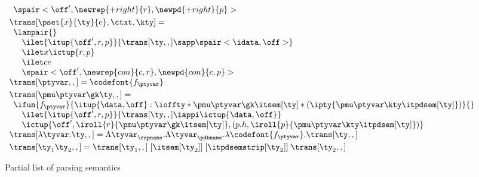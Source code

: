 \begin{figure}
\[\begin{array}{l}
\begin{array}{l}
{    \def \r {\newrep {+right}{r}}
    \def \p {\newpd {+right}{p}}
    \spair<\off',\r,\p>
  }\\ %
  \end{array}
\\[3pt]
  \trans[\pset{x}{\ty}{e},\ctxt,\kty] = \\
  \begin{array}{l}  
    \lampair{} \\
    \quad \ilet {\itup{\off',r,p}}{\trans[\ty,,] \sapp \spair<\idata,\off>} \\
    \quad \ilet x {\ictup{r,p}}\\
    \quad \ilet c e \\
    \quad \spair<\off',\newrep {con} {c,r},\newpd {con} {c,p}>
  \end{array}
\\[3pt]
\trans[\ptyvar,,] = \codefont{f_\ptyvar}
\\[3pt]
\trans[\pmu \ptyvar \gk \ty,,] = \\
  \begin{array}{l}
  \ifun {f_\ptyvar} {\itup{\data,\off} :
    \ioffty * \pmu \ptyvar \gk \itsem[\ty] 
                    * (\ipty{\pmu \ptyvar \kty \itpdsem[\ty]}) } {}\\
  \quad \ilet {\itup{\off',r,p}} 
   {\trans[\ty,,] \iappi \ictup{\data,\off}} \\ 
  \quad \ictup{\off',\iroll{r}{\pmu \ptyvar \gk \itsem[\ty]},
     (p.h,\iroll{p}{\pmu \ptyvar \kty \itpdsem[\ty]})}
  \end{array}  
\\[3pt]
\trans[\lambda\tyvar . \ty,,] = %
    \Lambda \tyvar_\repname. 
    \Lambda \tyvar_\pdbname. \lambda \codefont{f_\ptyvar}. \trans[\ty,,]
\\[3pt]
\trans[\ty_1 \ty_2,,] = 
    \trans[\ty_1,,]\; [\itsem[\ty_2]]\; [\itpdsemstrip[\ty_2]]\; \trans[\ty_2,,]
\\
\end{array}
\]
\caption{Partial list of \ddc{} parsing semantics}
\label{fig:ddc-sem}
\end{figure}

